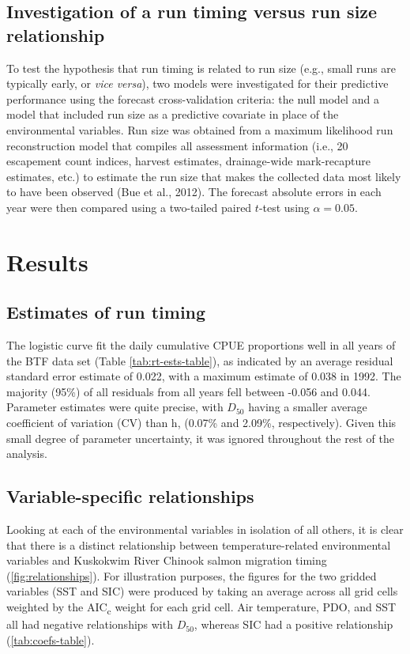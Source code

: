 \documentclass[12pt,]{book}
\theoremstyle{definition}
\theoremstyle{definition}
\theoremstyle{definition}
\theoremstyle{remark}
\begin{document}
\subsection{Investigation of a run timing versus run size
relationship}\label{investigation-of-a-run-timing-versus-run-size-relationship}

To test the hypothesis that run timing is related to run size (e.g.,
small runs are typically early, or \emph{vice versa}), two models were
investigated for their predictive performance using the forecast
cross-validation criteria: the null model and a model that included run
size as a predictive covariate in place of the environmental variables.
Run size was obtained from a maximum likelihood run reconstruction model
that compiles all assessment information (i.e., 20 escapement count
indices, harvest estimates, drainage-wide mark-recapture estimates,
etc.) to estimate the run size that makes the collected data most likely
to have been observed (Bue et al., 2012). The forecast absolute errors
in each year were then compared using a two-tailed paired \(t\)-test
using \(\alpha = 0.05\).

\section{Results}\label{results}

\subsection{Estimates of run timing}\label{estimates-of-run-timing}

\noindent
The logistic curve fit the daily cumulative CPUE proportions well in all
years of the BTF data set (Table \ref{tab:rt-ests-table}), as indicated
by an average residual standard error estimate of 0.022, with a maximum
estimate of 0.038 in 1992. The majority (95\%) of all residuals from all
years fell between -0.056 and 0.044. Parameter estimates were quite
precise, with \(D_50\) having a smaller average coefficient of variation
(CV) than h, (0.07\% and 2.09\%, respectively). Given this small degree
of parameter uncertainty, it was ignored throughout the rest of the
analysis.

\subsection{Variable-specific
relationships}\label{variable-specific-relationships}

\noindent
Looking at each of the environmental variables in isolation of all
others, it is clear that there is a distinct relationship between
temperature-related environmental variables and Kuskokwim River Chinook
salmon migration timing (\ref{fig:relationships}). For illustration
purposes, the figures for the two gridded variables (SST and SIC) were
produced by taking an average across all grid cells weighted by the
AIC\textsubscript{c} weight for each grid cell. Air temperature, PDO,
and SST all had negative relationships with \(D_{50}\), whereas SIC had
a positive relationship (\ref{tab:coefs-table}).
\end{document}
